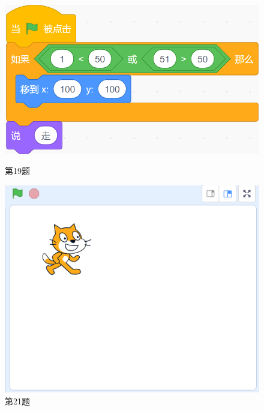 \documentclass[10pt, a4paper]{article}
\begin{document}
\begin{enumerate}
\begin{figure}[htbp]
\begin{minipage}[t]{.25\textwidth}
                \includegraphics[width=\textwidth]{19.png}
                \caption*{第19题}
            \end{minipage}
            \begin{minipage}[t]{.18\textwidth}
                \centering
                \includegraphics[width=\textwidth]{21.png}
                \caption*{第21题}
            \end{minipage}
            \begin{minipage}[t]{.14\textwidth}
                \centering

\end{minipage}
\end{figure}
\end{enumerate}
\end{document}
